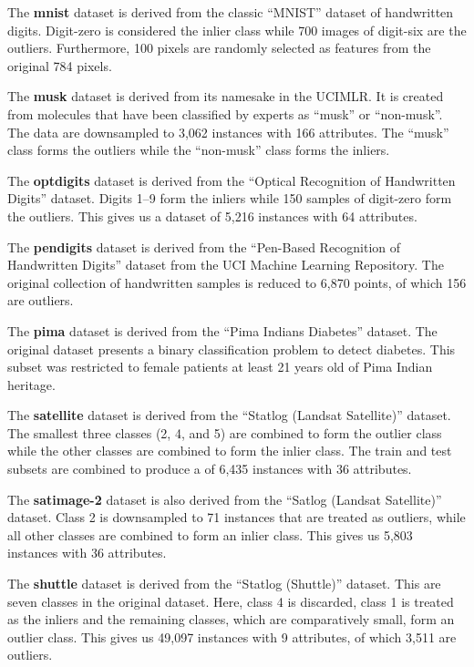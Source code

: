 \documentclass{article}
\begin{document}
The \textbf{mnist} dataset is derived from the classic ``MNIST'' dataset of handwritten digits.
Digit-zero is considered the inlier class while 700 images of digit-six are the outliers.
Furthermore, 100 pixels are randomly selected as features from the original 784 pixels.

The \textbf{musk} dataset is derived from its namesake in the UCIMLR\@.
It is created from molecules that have been classified by experts as ``musk'' or ``non-musk''.
The data are downsampled to 3,062 instances with 166 attributes.
The ``musk'' class forms the outliers while the ``non-musk'' class forms the inliers.

The \textbf{optdigits} dataset is derived from the ``Optical Recognition of Handwritten Digits'' dataset.
Digits 1--9 form the inliers while 150 samples of digit-zero form the outliers.
This gives us a dataset of 5,216 instances with 64 attributes.

The \textbf{pendigits} dataset is derived from the ``Pen-Based Recognition of Handwritten Digits'' dataset from the UCI Machine Learning Repository.
The original collection of handwritten samples is reduced to 6,870 points, of which 156 are outliers.

The \textbf{pima} dataset is derived from the ``Pima Indians Diabetes'' dataset.
The original dataset presents a binary classification problem to detect diabetes.
This subset was restricted to female patients at least 21 years old of Pima Indian heritage.

The \textbf{satellite} dataset is derived from the ``Statlog (Landsat Satellite)'' dataset.
The smallest three classes (2, 4, and 5) are combined to form the outlier class while the other classes are combined to form the inlier class.
The train and test subsets are combined to produce a of 6,435 instances with 36 attributes.

The \textbf{satimage-2} dataset is also derived from the ``Satlog (Landsat Satellite)'' dataset.
Class 2 is downsampled to 71 instances that are treated as outliers, while all other classes are combined to form an inlier class.
This gives us 5,803 instances with 36 attributes.

The \textbf{shuttle} dataset is derived from the ``Statlog (Shuttle)'' dataset.
This are seven classes in the original dataset.
Here, class 4 is discarded, class 1 is treated as the inliers and the remaining classes, which are comparatively small, form an outlier class.
This gives us 49,097 instances with 9 attributes, of which 3,511 are outliers.
\end{document}
